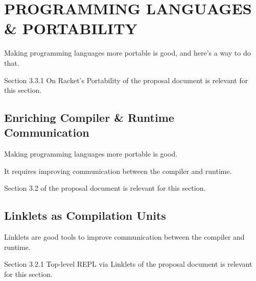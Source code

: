 \chapter[\texorpdfstring{PROGRAMMING LANGUAGES \& PORTABILITY}
                          {Linklets}]{PROGRAMMING LANGUAGES \& PORTABILITY}
\label{chapter:linklets}

	\begin{chaptersynopsis}

		Making programming languages more portable is good, and here's a way to do that.

	\end{chaptersynopsis}

	\begin{todo}[Import]
			Section 3.3.1 On Racket's Portability of the proposal document is relevant for this section.
		\end{todo}



	\section{Enriching Compiler \& Runtime Communication}

		\begin{mainpoint}
			Making programming languages more portable is good.

			It requires improving communication between the compiler and runtime.
		\end{mainpoint}

		\begin{todo}[Import]
			Section 3.2 of the proposal document is relevant for this section.
		\end{todo}

	\section{Linklets as Compilation Units}
		\label{section:linklet-semantics}

		\begin{mainpoint}
			Linklets are good tools to improve communication between the compiler and runtime.
		\end{mainpoint}

		\begin{todo}[Import]
			Section 3.2.1 Top-level REPL via Linklets of the proposal document is relevant for this section.
		\end{todo}


